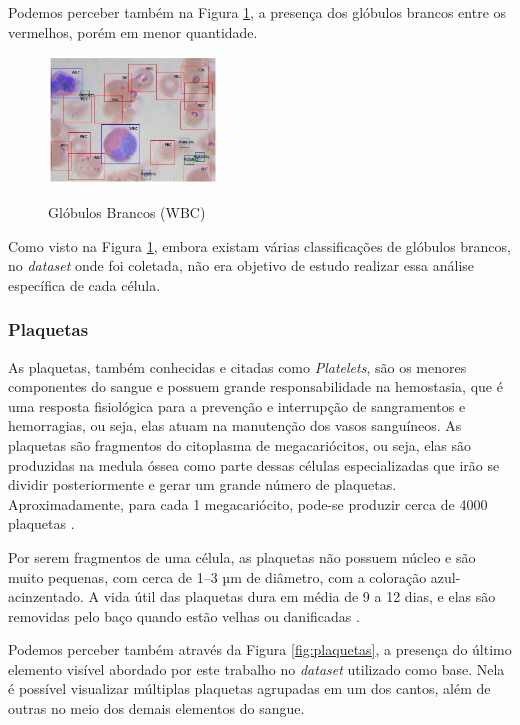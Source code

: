 Podemos perceber também na Figura \ref{fig:wbc}, a presença dos glóbulos brancos entre os vermelhos, porém em menor quantidade.

\begin{figure}[!htb]
	\centering
	\caption{Glóbulos Brancos (WBC)}
	\includegraphics[width=0.40\textwidth]{img/wbc.jpg}
	\label{fig:wbc}
\end{figure}

Como visto na Figura \ref{fig:wbc}, embora existam várias classificações de glóbulos brancos, no \emph{dataset} onde foi coletada, não era objetivo de estudo realizar essa análise específica de cada célula.

\subsubsection{Plaquetas}
As plaquetas, também conhecidas e citadas como \emph{Platelets}, são os menores componentes do sangue e possuem grande responsabilidade na hemostasia, que é uma resposta fisiológica para a prevenção e interrupção de sangramentos e hemorragias, ou seja, elas atuam na manutenção dos vasos sanguíneos. As plaquetas são fragmentos do citoplasma de megacariócitos, ou seja, elas são produzidas na medula óssea como parte dessas células especializadas que irão se dividir posteriormente e gerar um grande número de plaquetas. Aproximadamente, para cada 1 megacariócito, pode-se produzir cerca de 4000 plaquetas \cite{abcOfCbc}.

Por serem fragmentos de uma célula, as plaquetas não possuem núcleo e são muito pequenas, com cerca de 1–3 µm de diâmetro, com a coloração azul-acinzentado. A vida útil das plaquetas dura em média de 9 a 12 dias, e elas são removidas pelo baço quando estão velhas ou danificadas \cite{abcOfCbc}.

Podemos perceber também através da Figura \ref{fig:plaquetas}, a presença do último elemento visível abordado por este trabalho no \emph{dataset} utilizado como base. Nela é possível visualizar múltiplas plaquetas agrupadas em um dos cantos, além de outras no meio dos demais elementos do sangue.

